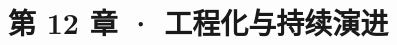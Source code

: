 \chapter{第 12 章 ·
工程化与持续演进}\label{ux7b2c-12-ux7ae0-ux5de5ux7a0bux5316ux4e0eux6301ux7eedux6f14ux8fdb}

\newpage
